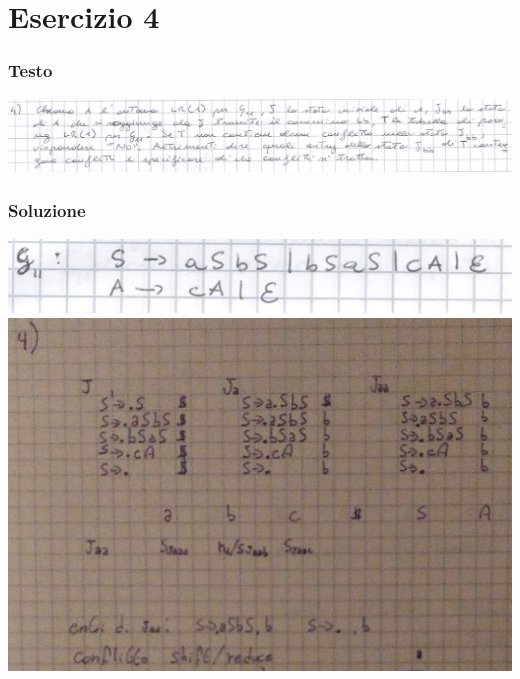 \chapter{Esercizio 4}

\subsection{Testo}

\begin{center}
    \includegraphics[scale=0.2]{Chapters/Img/04text.png}\\
\end{center} 

\subsection{Soluzione}

\begin{center}
    \includegraphics[scale=0.4]{Chapters/Img/g11.png}
    \includegraphics[scale=0.6]{Chapters/Img/04solution.png}\\
\end{center} 

